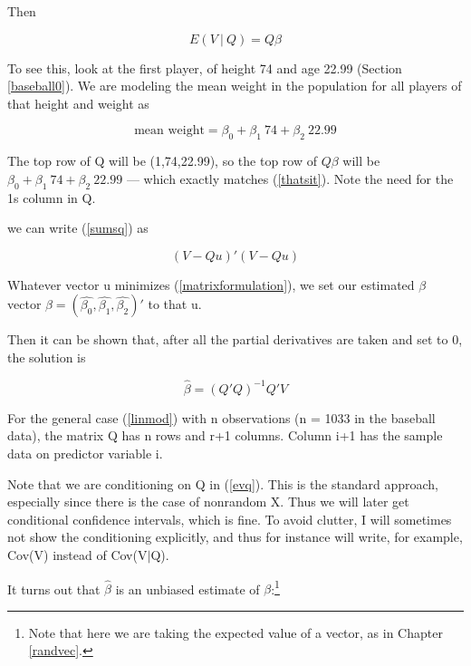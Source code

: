 Then 

\begin{equation}
\label{evq}
E(V ~|~ Q) = Q \beta
\end{equation}

To see this, look at the first player, of height 74 and age 22.99
(Section \ref{baseball0}).  We are modeling the mean weight in the
population for all players of that height and weight as

\begin{equation}
\label{thatsit}
\textrm{mean weight} = \beta_0 + \beta_1 ~ 74 +
\beta_2 ~ 22.99
\end{equation} 

The top row of Q will be (1,74,22.99), so the top row of $Q \beta$ will be
$\beta_0 + \beta_1 ~ 74 + \beta_2 ~ 22.99$ --- which exactly matches
(\ref{thatsit}).  Note the need for the 1s column in Q.

we can write (\ref{sumsq}) as

\begin{equation}
\label{matrixformulation}
(V - Qu)' (V-Qu)
\end{equation}

Whatever vector u minimizes (\ref{matrixformulation}), we set our
estimated $\beta$ vector $\widehat{\beta} = (\widehat{\beta_0},
\widehat{\beta_1}, \widehat{\beta_2})' $ to that u.

Then it can be shown that, after all the partial derivatives are taken
and set to 0, the solution is

\begin{equation}
\label{betahat}
\hat{\beta} = (Q'Q)^{-1} Q'V
\end{equation}

For the general case (\ref{linmod}) with n observations (n = 1033 in the
baseball data), the matrix Q has n rows and r+1 columns.  Column i+1 has
the sample data on predictor variable i.  

Note that we are conditioning on Q in (\ref{evq}).  This is the standard
approach, especially since there is the case of nonrandom X.  Thus we
will later get conditional confidence intervals, which is fine.  To
avoid clutter, I will sometimes not show the conditioning explicitly,
and thus for instance will write, for example, Cov(V) instead of
Cov(V$|$Q).

It turns out that $\hat{\beta}$ is an unbiased estimate of $\beta$:\footnote
{Note that here we are taking the expected value of a vector, as in
Chapter \ref{randvec}.} 

